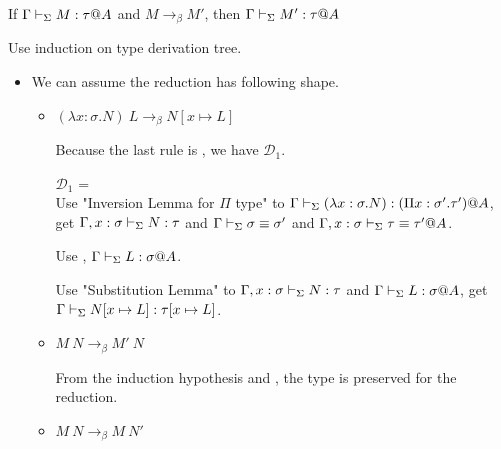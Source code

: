 \begin{theorem}
	If $\G\V M:\tau@A$ and $M \longrightarrow_{\beta} M'$, then $\G\V M':\tau@A$\\
\end{theorem}

Use induction on type derivation tree.

\begin{itemize}
	\newcommand{\LB}{\longrightarrow_{\beta}}
		
	\item \TApp
	      	      
	      We can assume the reduction has following shape.
	      	      
	      \begin{itemize}
	      	\item $(\lambda x:\sigma.N)\ L \LB N[x\mapsto L]$
	      	      	      	      
	      	      Because the last rule is \TApp, we have $\mathcal{D}_1$.
	      	      	      	      
	      	      $\mathcal{D}_1$ = 
	      	      { \andalso {}} \\
	      	      	      	      
	      	      Use "Inversion Lemma for $\Pi$ type" to $\Gamma \vdash_\Sigma (\lambda x:\sigma.N) : (\Pi x:\sigma'.\tau')@A$,\\
	      	      get $\Gamma, x:\sigma \vdash_\Sigma N:\tau$ and $\Gamma \vdash_\Sigma \sigma \equiv \sigma'$ and $\Gamma ,x:\sigma \vdash_\Sigma \tau \equiv \tau'@A$.
	      	      	      	      
	      	      Use \TConv, $\Gamma \vdash_\Sigma L:\sigma @A$.
	      	      	      	      
	      	      Use "Substitution Lemma" to $\Gamma, x:\sigma \vdash_\Sigma N:\tau$ and $\Gamma \vdash_\Sigma L:\sigma @A$, get $\Gamma \vdash_\Sigma N[x\mapsto L]:\tau[x\mapsto L]$.
	      	      	      	      
	      	\item $M\ N \LB M'\ N$
	      	      	      	      
	      	      From the induction hypothesis and \TApp, the type is preserved for the reduction.
	      	\item $M\ N \LB M\ N'$
	      	      	      	      

\end{itemize}
\end{itemize}
